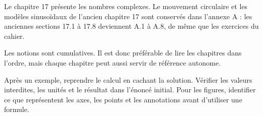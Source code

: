 Le chapitre 17 présente les nombres complexes. Le mouvement circulaire et les modèles sinusoïdaux de l'ancien chapitre 17 sont conservés dans l'annexe A : les anciennes sections 17.1 à 17.8 deviennent A.1 à A.8, de même que les exercices du cahier.

Les notions sont cumulatives. Il est donc préférable de lire les chapitres dans l'ordre, mais chaque chapitre peut aussi servir de référence autonome.

Après un exemple, reprendre le calcul en cachant la solution. Vérifier les valeurs interdites, les unités et le résultat dans l'énoncé initial. Pour les figures, identifier ce que représentent les axes, les points et les annotations avant d'utiliser une formule.

\tableofcontents
\mainmatter

